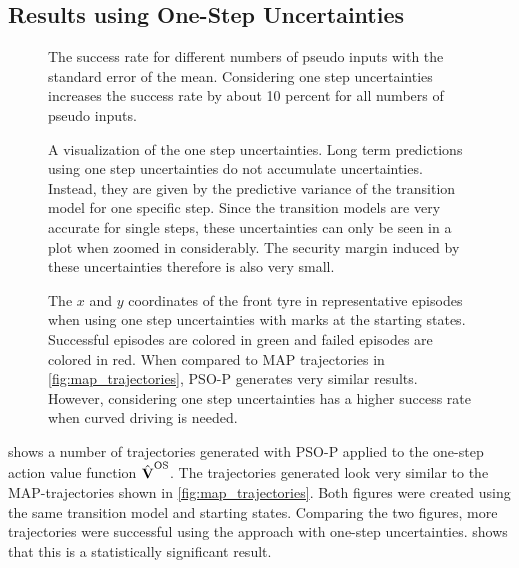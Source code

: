 \subsection{Results using One-Step Uncertainties}
\begin{figure}[tp]
    \centering
    \caption[Results using one step uncertainties]{
        The success rate for different numbers of pseudo inputs with the standard error of the mean.
        Considering one step uncertainties increases the success rate by about 10 percent for all numbers of pseudo inputs.
    }
    \label{fig:os_results}
\end{figure}
\begin{figure}[tp]
    \centering
    \caption[One step uncertainties]{
        A visualization of the one step uncertainties.
        Long term predictions using one step uncertainties do not accumulate uncertainties.
        Instead, they are given by the predictive variance of the transition model for one specific step.
        Since the transition models are very accurate for single steps, these uncertainties can only be seen in a plot when zoomed in considerably.
        The security margin induced by these uncertainties therefore is also very small.
    }
    \label{fig:os_uncertainties}
\end{figure}
\begin{figure}[p]
    \centering
    \caption[Episodes using one step uncertainties]{
        The $x$ and $y$ coordinates of the front tyre in representative episodes when using one step uncertainties with marks at the starting states.
        Successful episodes are colored in green and failed episodes are colored in red.
        When compared to MAP trajectories in \cref{fig:map_trajectories}, PSO-P generates very similar results.
        However, considering one step uncertainties has a higher success rate when curved driving is needed.
    }
    \label{fig:os_trajectories}
\end{figure}
 shows a number of trajectories generated with PSO-P applied to the one-step action value function $\operatorname{\hat{\operatorname{\mathbf{V}}}}^{\text{OS}}$.
The trajectories generated look very similar to the MAP-trajectories shown in \cref{fig:map_trajectories}.
Both figures were created using the same transition model and starting states.
Comparing the two figures, more trajectories were successful using the approach with one-step uncertainties.
 shows that this is a statistically significant result.

